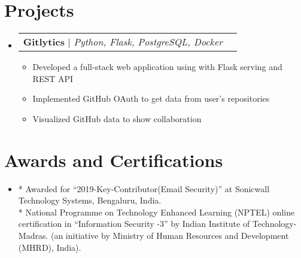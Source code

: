 \documentclass[letterpaper,11pt]{article}
\makeatletter
\newcommand{\resumeItem}[1]{
  \item\small{
    {#1 \vspace{-2pt}}
  }
}
\newcommand{\resumeProjectHeading}[2]{
    \item
    \begin{tabular*}{0.97\textwidth}{l@{\extracolsep{\fill}}r}
      \small#1 & #2 \\
    \end{tabular*}\vspace{-7pt}
}
\newcommand{\resumeSubHeadingListStart}{\begin{itemize}[leftmargin=0.15in, label={}]}
\newcommand{\resumeSubHeadingListEnd}{\end{itemize}}
\newcommand{\resumeItemListStart}{\begin{itemize}}
\newcommand{\resumeItemListEnd}{\end{itemize}\vspace{-5pt}}
\makeatother
\begin{document}
\section{Projects}
    \resumeSubHeadingListStart
      \resumeProjectHeading
          {\textbf{Gitlytics} $|$ \emph{Python, Flask, PostgreSQL, Docker}}{}
          \resumeItemListStart
            \resumeItem{Developed a full-stack web application using with Flask serving and REST API}
            \resumeItem{Implemented GitHub OAuth to get data from user’s repositories}
            \resumeItem{Visualized GitHub data to show collaboration}
          \resumeItemListEnd
    \resumeSubHeadingListEnd

\section{Awards and Certifications}
 \begin{itemize}[leftmargin=0.15in, label={}]
  \item{* Awarded for “2019-Key-Contributor(Email Security)” at Sonicwall Technology Systems, Bengaluru, India.}\\{* National Programme on Technology Enhanced Learning (NPTEL) online certification in “Information Security -3” by Indian Institute of Technology-Madras. (an initiative by Ministry of Human Resources and Development (MHRD), India).}
 \end{itemize}
\end{document}
